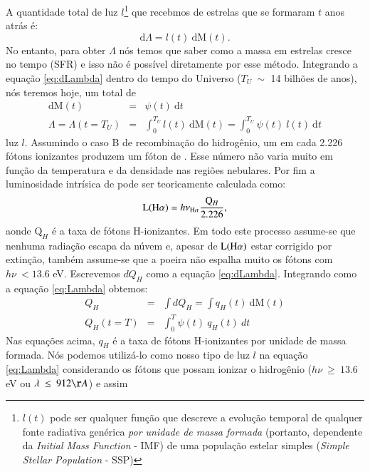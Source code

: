 A quantidade total de luz $l$\footnote{$l(t)$ pode ser qualquer função que descreve a evolução
temporal de qualquer fonte radiativa genérica \emph{por unidade de massa formada} (portanto,
dependente da {\em Initial Mass Function} - IMF) de uma população estelar simples ({\em Simple
Stellar Population} - SSP)} que recebmos de estrelas que se formaram $t$ anos atrás é:
\begin{equation}
	\mathrm{d}\Lambda = l(t)\ \mathrm{d}\mathrm{M}(t).
	\label{eq:dLambda}
\end{equation}
\noindent No entanto, para obter $\Lambda$ nós temos que saber como a massa em estrelas cresce no
tempo (SFR) e isso não é possível diretamente por esse método. Integrando a equação
\eqref{eq:dLambda} dentro do tempo do Universo ($T_U\ \sim$ 14 bilhões de anos), nós teremos hoje,
um total de
\begin{eqnarray}
	\mathrm{d}\mathrm{M}(t) &=& \psi(t)\ \mathrm{d}t \\
	\Lambda = \Lambda(t = T_U) &=& \int_0^{T_U} l(t)\ \textrm{d}\textrm{M}(t) = \int_0^{T_U} \psi(t)\
	l(t)\ \textrm{d}t
	\label{eq:Lambda}
\end{eqnarray}
\noindent luz $l$. Assumindo o caso B de recombinação do hidrogênio, um em cada 2.226 fótons
ionizantes produzem um fóton de \Halpha \citep{Osterbrock.Ferland.2006a}. Esse número não varia
muito em função da temperatura e da densidade nas regiões nebulares. Por fim a luminosidade
intrísica de \Halpha pode ser teoricamente calculada como:
\begin{equation}
	\mathrm{L}(\Halpha) = h \nu_{\Halpha} \frac{\mathrm{Q}_H}{2.226},
	\label{eq:LHa_recomb_theory}
\end{equation}
\noindent aonde $\mathrm{Q}_H$ é a taxa de fótons H-ionizantes. Em todo este processo
assume-se que nenhuma radiação escapa da núvem e, apesar de $\mathrm{L}(\Halpha)$ estar corrigido
por extinção, também assume-se que a poeira não espalha muito os fótons com $h\nu\ < 13.6$ eV.
Escrevemos $dQ_H$ como a equação \eqref{eq:dLambda}. Integrando como a equação \eqref{eq:Lambda}
obtemos:
\begin{eqnarray}
	Q_H &=& \int dQ_H = \int q_H(t)\ \mathrm{d}\mathrm{M}(t) \\ 
	Q_H(t = T) &=& \int_0^T \psi(t)\ q_H(t)\ dt
	\label{eq:QH}
\end{eqnarray}
\noindent Nas equações acima, $q_H$ é a taxa de fótons H-ionizantes por unidade de massa formada.
Nós podemos utilizá-lo como nosso tipo de luz $l$ na equação \eqref{eq:Lambda} considerando os
fótons que possam ionizar o hidrogênio ($h\nu\ \geq\ 13.6$ eV ou $\lambda\ \leq\ 912\AA$) e assim
